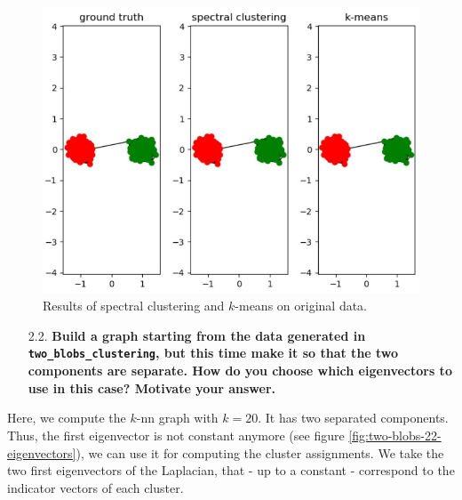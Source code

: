 \documentclass[a4paper, 11pt]{report}
\begin{document}
    \begin{figure}[!h]
        \centering
        \includegraphics[scale=0.55]{images/question_21_results.jpg}
        \caption{Results of spectral clustering and $k$-means on original data.}
        \label{fig:question-21-results}
    \end{figure}
    
    \pagebreak
    
\begin{itemize}
    \item[2.2.] \textbf{Build a graph starting from the data generated in \texttt{two\_blobs\_clustering}, but this time make it so that the two components are separate. How do you choose which eigenvectors to use in this case? Motivate your answer.}
\end{itemize}

    Here, we compute the $k$-nn graph with $k = 20$. It has two separated components. Thus, the first eigenvector is not constant anymore (see figure \ref{fig:two-blobs-22-eigenvectors}), we can use it for computing the cluster assignments. We take the two first eigenvectors of the Laplacian, that - up to a constant - correspond to the indicator vectors of each cluster.
    
\end{document}
